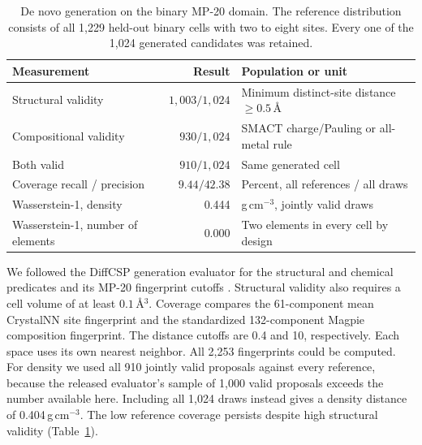 \begin{table}[!htbp]\centering\small
\caption{De novo generation on the binary MP-20 domain. The reference distribution consists of all 1,229 held-out binary cells with two to eight sites. Every one of the 1,024 generated candidates was retained.}\label{tab:denovo}
\begin{tabular}{lrl}\hline
Measurement & Result & Population or unit\\\hline
Structural validity & $1{,}003/1{,}024$ & Minimum distinct-site distance $\geq 0.5$\,\AA\\
Compositional validity & $930/1{,}024$ & SMACT charge/Pauling or all-metal rule\\
Both valid & $910/1{,}024$ & Same generated cell\\
Coverage recall / precision & $9.44/42.38$ & Percent, all references / all draws\\
Wasserstein-1, density & 0.444 & g\,cm$^{-3}$, jointly valid draws\\
Wasserstein-1, number of elements & 0.000 & Two elements in every cell by design\\\hline
\end{tabular}\end{table}
We followed the DiffCSP generation evaluator for the structural and chemical predicates and its MP-20 fingerprint cutoffs \cite{diffcsp,smact,matminer}. Structural validity also requires a cell volume of at least $0.1$\,\AA$^3$. Coverage compares the 61-component mean CrystalNN site fingerprint and the standardized 132-component Magpie composition fingerprint. The distance cutoffs are 0.4 and 10, respectively. Each space uses its own nearest neighbor. All 2,253 fingerprints could be computed. For density we used all 910 jointly valid proposals against every reference, because the released evaluator's sample of 1,000 valid proposals exceeds the number available here. Including all 1,024 draws instead gives a density distance of 0.404\,g\,cm$^{-3}$. The low reference coverage persists despite high structural validity (Table~\ref{tab:denovo}).
